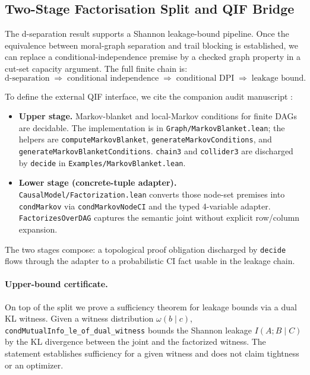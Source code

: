 \documentclass[acmsmall,screen,review,anonymous,nonacm]{acmart}
\newcommand{\lean}[1]{\lstinline!#1!}
\begin{document}
\subsection{Two-Stage Factorisation Split and QIF Bridge}\label{sec:two-stage}

The d-separation result supports a Shannon leakage-bound pipeline.
Once the equivalence between moral-graph separation and trail blocking is
established, we can replace a conditional-independence premise by a checked
graph property in a cut-set capacity argument. The full finite chain is:
\[
\text{d-separation} \;\Rightarrow\; \text{conditional independence}
\;\Rightarrow\; \text{conditional DPI} \;\Rightarrow\; \text{leakage bound}.
\]

To define the external QIF interface, we cite the companion audit manuscript
\cite{agentaudit2026}:

\begin{itemize}
  \item \textbf{Upper stage.} Markov-blanket and local-Markov conditions for
    finite DAGs are decidable.  The implementation is in
    \lean{Graph/MarkovBlanket.lean}; the helpers are
    \lean{computeMarkovBlanket}, \lean{generateMarkovConditions}, and
    \lean{generateMarkovBlanketConditions}.  \lean{chain3} and
    \lean{collider3} are discharged by \lean{decide} in
    \lean{Examples/MarkovBlanket.lean}.
  \item \textbf{Lower stage (concrete-tuple adapter).}
    \lean{CausalModel/Factorization.lean} converts those node-set premises into
    \lean{condMarkov} via \lean{condMarkovNodeCI} and the typed 4-variable
    adapter.  \lean{FactorizesOverDAG} captures the semantic joint without
    explicit row/column expansion.
\end{itemize}

The two stages compose: a topological proof obligation discharged by
\lean{decide} flows through the adapter to a probabilistic CI fact usable in
the leakage chain.

\paragraph{Upper-bound certificate.} On top of the split we
prove a sufficiency theorem for leakage bounds via a dual KL witness.
Given a witness distribution $\omega(b\mid c)$,
\lean{condMutualInfo_le_of_dual_witness} bounds the Shannon leakage
$I(A;B\mid C)$ by the KL divergence between the joint and the factorized
witness.  The statement establishes sufficiency for a given witness and does
not claim tightness or an optimizer.
\end{document}
